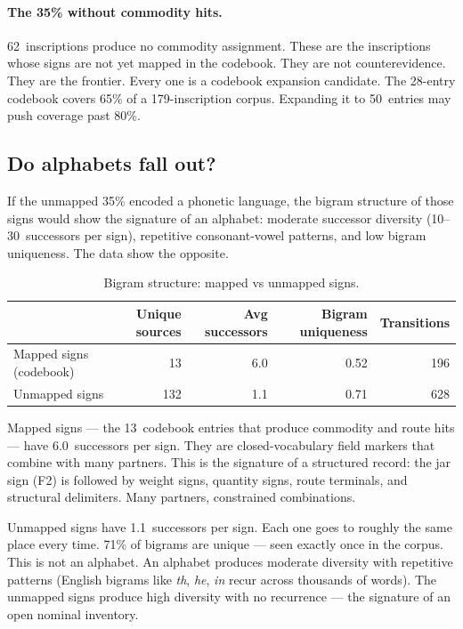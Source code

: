 \paragraph{The 35\% without commodity hits.}
62~inscriptions produce no commodity assignment. These are the
inscriptions whose signs are not yet mapped in the codebook.
They are not counterevidence. They are the frontier. Every one
is a codebook expansion candidate. The 28-entry codebook covers
65\% of a 179-inscription corpus. Expanding it to 50~entries
may push coverage past 80\%.

\subsection{Do alphabets fall out?}

If the unmapped 35\% encoded a phonetic language, the bigram
structure of those signs would show the signature of an alphabet:
moderate successor diversity (10--30~successors per sign),
repetitive consonant-vowel patterns, and low bigram uniqueness.
The data show the opposite.

\begin{longtable}{@{}lrrrr@{}}
\caption{Bigram structure: mapped vs unmapped signs.}
\label{tab:bigram}\\
\toprule
 & Unique sources & Avg successors & Bigram uniqueness & Transitions \\
\midrule
\endfirsthead
\bottomrule
\endlastfoot
Mapped signs (codebook) & 13 & 6.0 & 0.52 & 196 \\
\midrule
Unmapped signs & 132 & 1.1 & 0.71 & 628 \\
\end{longtable}

\noindent
Mapped signs --- the 13~codebook entries that produce commodity and
route hits --- have 6.0~successors per sign. They are
closed-vocabulary field markers that combine with many partners.
This is the signature of a structured record: the jar sign (F2) is
followed by weight signs, quantity signs, route terminals, and
structural delimiters. Many partners, constrained combinations.

Unmapped signs have 1.1~successors per sign. Each one goes to
roughly the same place every time. 71\% of bigrams are unique ---
seen exactly once in the corpus. This is not an alphabet. An
alphabet produces moderate diversity with repetitive patterns
(English bigrams like \textit{th}, \textit{he}, \textit{in}
recur across thousands of words). The unmapped signs produce
high diversity with no recurrence --- the signature of an open
nominal inventory.

